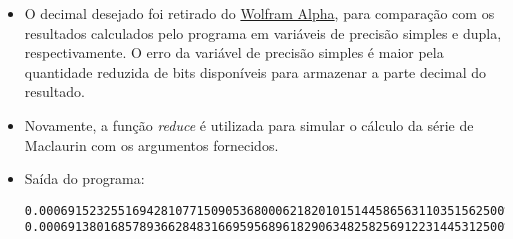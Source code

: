 \documentclass{article}
\newenvironment{arabenum}{
    \begin{enumerate}[label=\textbf{\arabic*})]
}{
    \end{enumerate}
}
\newenvironment{discusscode}[1]{
    
    \vspace{-2mm}
    \begin{itemize}
}{
    \end{itemize}
}
\begin{document}
\begin{arabenum}
\begin{discusscode}{maclaurin.py}
\item O decimal desejado foi retirado do
\href{http://www.wolframalpha.com/input/?i=e%5E(-.111)}{Wolfram Alpha}, para
comparação com os resultados calculados pelo programa em variáveis de precisão
simples e dupla, respectivamente. O erro da variável de precisão simples é maior
pela quantidade reduzida de bits disponíveis para armazenar a parte decimal do
resultado.

\item Novamente, a função \emph{reduce} é utilizada para simular o cálculo da
série de Maclaurin com os argumentos fornecidos.

\item Saída do programa:
\begin{verbatim}
0.00069152325516942810771509053680006218201015144586563110351562500%
0.00069138016857893662848316695956896182906348258256912231445312500%
\end{verbatim}

\end{discusscode}

\end{arabenum}
\end{document}
